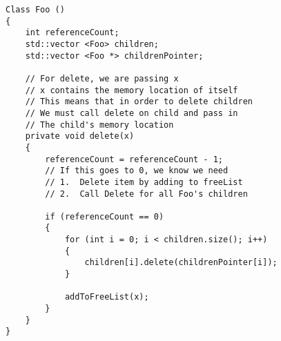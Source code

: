\documentclass[11pt]{article}
\begin{document}
\begin{enumerate}
\begin{enumerate}
\begin{verbatim}
Class Foo () 
{
    int referenceCount;
    std::vector <Foo> children;
    std::vector <Foo *> childrenPointer;
    
    // For delete, we are passing x
    // x contains the memory location of itself
    // This means that in order to delete children
    // We must call delete on child and pass in
    // The child's memory location
    private void delete(x)
    {
        referenceCount = referenceCount - 1;
        // If this goes to 0, we know we need 
        // 1.  Delete item by adding to freeList
        // 2.  Call Delete for all Foo's children
        
        if (referenceCount == 0)
        {
            for (int i = 0; i < children.size(); i++)
            {
                children[i].delete(childrenPointer[i]);
            }
            
            addToFreeList(x);
        }
    }
}
\end{verbatim}
\end{enumerate}

\end{enumerate}
\end{document}
